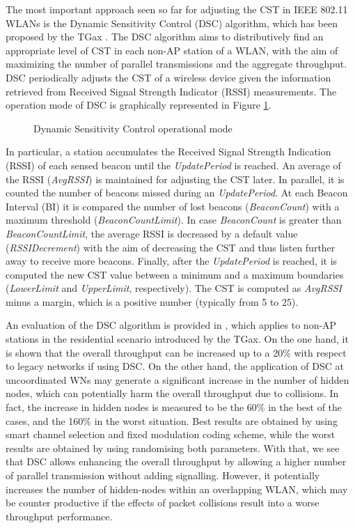 \documentclass[12pt, a4paper,twoside]{tesi_upf}
\begin{document}
			The most important approach seen so far for adjusting the CST in IEEE 802.11 WLANs is the Dynamic Sensitivity Control (DSC) algorithm, which has been proposed by the TGax \cite{smith2015dynamic}. The DSC algorithm aims to distributively find an appropriate level of CST in each non-AP station of a WLAN, with the aim of maximizing the number of parallel transmissions and the aggregate throughput. DSC periodically adjusts the CST of a wireless device given the information retrieved from Received Signal Strength Indicator (RSSI) measurements. The operation mode of DSC is graphically represented in Figure \ref{fig:dsc_flowchart}.				
			\begin{figure}[t!]
				\centering
				\caption{Dynamic Sensitivity Control operational mode}
				\label{fig:dsc_flowchart}
			\end{figure}
		
			In particular, a station accumulates the Received Signal Strength Indication (RSSI) of  each  sensed  beacon until the \textit{UpdatePeriod} is reached. An average of the RSSI (\textit{AvgRSSI}) is maintained for adjusting the CST later. In parallel, it is counted the number of beacons missed during an \textit{UpdatePeriod}. At each Beacon Interval (BI) it is compared the number of lost beacons (\textit{BeaconCount}) with a maximum threshold (\textit{BeaconCountLimit}). In case \textit{BeaconCount} is greater than \textit{BeaconCountLimit}, the average RSSI is decreased by a default value (\textit{RSSIDecrement}) with the aim of decreasing the CST and thus listen further away to receive more beacons. Finally, after the \textit{UpdatePeriod} is reached, it is computed the new CST value between a minimum and a maximum boundaries (\textit{LowerLimit} and \textit{UpperLimit}, respectively). The CST is computed as \textit{AvgRSSI} minus a margin, which is a positive number (typically from 5 to 25).
					
			An evaluation of the DSC algorithm is provided in \cite{afaqui2015evaluation}, which 
			applies to non-AP stations in the residential scenario introduced by the TGax. On the one hand, it is shown that the overall throughput can be increased up to a 20\% with respect to legacy networks if using DSC. On the other hand, the application of DSC at uncoordinated WNs may generate a significant increase in the number of hidden nodes, which can potentially harm the overall throughput due to collisions. In fact, the increase in hidden nodes is measured to be the 60\% in the best of the cases, and the 160\% in the worst situation. Best results are obtained by using smart channel selection and fixed modulation coding scheme, while the worst results are obtained by using randomising both parameters. With that, we see that DSC allows enhancing the overall throughput by allowing a higher number of parallel transmission without adding signalling. However, it potentially increases the number of hidden-nodes within an overlapping WLAN, which may be counter productive if the effects of packet collisions result into a worse throughput performance.
			
\end{document}
